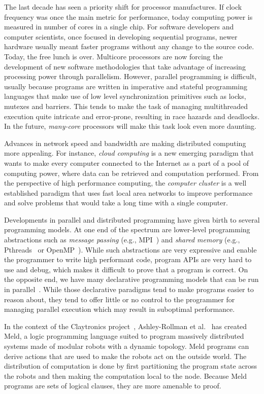 
The last decade has seen a priority shift for processor manufactures. If clock frequency
was once the main metric for performance, today computing power is measured in number of
cores in a single chip.
For software developers and computer scientists, once focused in developing sequential programs,
newer hardware usually meant faster programs without any change to the source code. Today,
the free lunch is over. Multicore processors are now forcing the development of
new software methodologies that take advantage of increasing processing power through parallelism.
However, parallel programming is difficult, usually because programs are written
in imperative and stateful programming languages that make use of low level synchronization
primitives such as locks, mutexes and barriers. This tends to make the task of managing multithreaded
execution quite intricate and error-prone, resulting in race hazards and deadlocks.
In the future, \emph{many-core} processors will make this task look even more daunting.

Advances in network speed and bandwidth are making distributed computing
more appealing. For instance, \emph{cloud computing} is a new emerging paradigm that wants
to make every computer connected to the Internet as a part of a pool of computing power,
where data can be retrieved and computation performed. From the perspective of high performance
computing, the \emph{computer cluster} is a well established paradigm that uses fast local area
networks to improve performance and solve problems that would take a long time with a single computer.

Developments in parallel and distributed programming have given birth to several programming models.
At one end of the spectrum are lower-level programming abstractions such as
\emph{message passing} (e.g., MPI~\cite{gabriel04-open-mpi}) and \emph{shared memory}
(e.g., Pthreads~\cite{Butenhof:1997:PPT:263953} or OpenMP~\cite{Chapman-2007-UOP-1370966}).
While such abstractions are very expressive and enable the programmer to write high performant code,
program APIs are very hard to use and debug, which makes it difficult to prove that a program is correct.
On the opposite end, we have many declarative programming models
that can be run in parallel~\cite{Blelloch:1996:PPA:227234.227246}.
While those declarative paradigms tend to make programs easier to reason about, they tend to offer
little or no control to the programmer for managing parallel execution
which may result in suboptimal performance.

In the context of the Claytronics project~\cite{goldstein-computer05}, Ashley-Rollman et al.~\cite{ashley-rollman-iclp09, ashley-rollman-derosa-iros07wksp}
has created Meld, a logic programming language suited to program massively distributed systems made of modular robots with a dynamic topology.
Meld programs can derive actions that are used
to make the robots act on the outside world. The distribution of computation is done
by first partitioning the program state across the robots and then making the computation local to the node. Because Meld programs
are sets of logical clauses, they are more amenable to proof.

